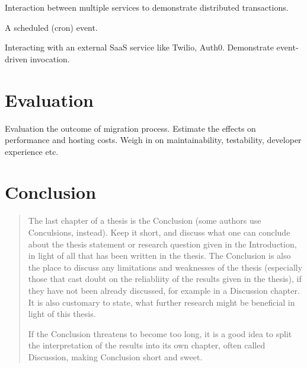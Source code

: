 \documentclass[utf8,english]{gradu3}
\begin{document}
Interaction between multiple services to demonstrate distributed transactions.

A scheduled (cron) event.

Interacting with an external SaaS service like Twilio, Auth0. Demonstrate event-driven invocation.

\chapter{Evaluation}

Evaluation the outcome of migration process. Estimate the effects on performance and hosting costs. Weigh in on maintainability, testability, developer experience etc.

\chapter{Conclusion}

\begin{quote}
The last chapter of a thesis is the Conclusion (some authors use
Conculsions, instead).  Keep it short, and discuss what one can
conclude about the thesis statement or research question given in the
Introduction, in light of all that has been written in the thesis.
The Conclusion is also the place to discuss any limitations and
weaknesses of the thesis (especially those that cast doubt on the
reliabliity of the results given in the thesis), if they have not been
already discussed, for example in a Discussion chapter.  It is also
customary to state, what further research might be beneficial in light
of this thesis.

If the Conclusion threatens to become too long, it is a good idea to
split the interpretation of the results into its own chapter, often
called Discussion, making Conclusion short and sweet.
\end{quote}

\printbibliography
\end{document}
